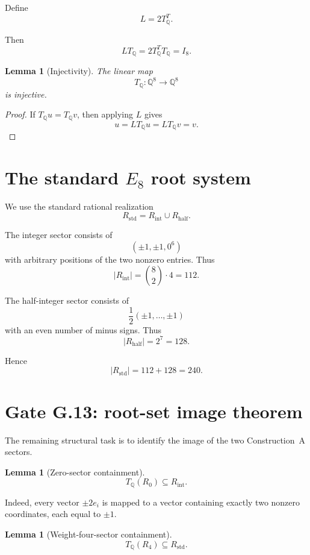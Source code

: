 \documentclass[11pt,a4paper]{article}
\newtheorem{lemma}[theorem]{Lemma}
\theoremstyle{definition}
\theoremstyle{remark}
\newcommand{\Q}{\mathbb Q}
\newcommand{\Rstd}{R_{\mathrm{std}}}
\newcommand{\TQ}{T_{\mathbb Q}}
\begin{document}
Define
\[
L=2\TQ^T.
\]

Then
\[
L\TQ
=
2\TQ^T\TQ
=
I_8.
\]

\begin{lemma}[Injectivity]
The linear map
\[
\TQ:\Q^8\to\Q^8
\]
is injective.
\end{lemma}

\begin{proof}
If $\TQ u=\TQ v$, then applying $L$ gives
\[
u
=
L\TQ u
=
L\TQ v
=
v.
\]
\end{proof}

\section{The standard $E_8$ root system}

We use the standard rational realization
\[
\Rstd
=
R_{\mathrm{int}}
\cup
R_{\mathrm{half}}.
\]

The integer sector consists of
\[
(\pm1,\pm1,0^6)
\]
with arbitrary positions of the two nonzero entries.  Thus
\[
|R_{\mathrm{int}}|
=
\binom82\cdot4
=
112.
\]

The half-integer sector consists of
\[
\frac12(\pm1,\ldots,\pm1)
\]
with an even number of minus signs.  Thus
\[
|R_{\mathrm{half}}|
=
2^7
=
128.
\]

Hence
\[
\boxed{
|\Rstd|=112+128=240.
}
\]

\section{Gate G.13: root-set image theorem}

The remaining structural task is to identify the image of the two
Construction~A sectors.

\begin{lemma}[Zero-sector containment]
\[
\TQ(R_0)\subseteq R_{\mathrm{int}}.
\]
\end{lemma}

Indeed, every vector $\pm2e_i$ is mapped to a vector containing exactly two
nonzero coordinates, each equal to $\pm1$.

\begin{lemma}[Weight-four-sector containment]
\[
\TQ(R_4)
\subseteq
\Rstd.
\]
\end{lemma}
\end{document}
